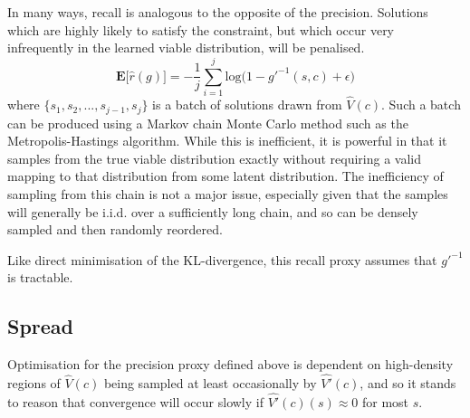\documentclass[../../main.tex]{subfiles}
\begin{document}
In many ways, recall is analogous to the opposite of the precision.
Solutions which are highly likely to satisfy the constraint, but which occur very infrequently in the learned viable distribution, will be penalised.
$$\textbf{E}\big[\hat{r}(g)\big] = -\frac{1}{j}\sum_{i=1}^{j}
\text{log} \big( 1 - g'^{-1}(s, c) + \epsilon \big)
$$
where $\{s_1, s_2, ..., s_{j-1}, s_j\}$ is a batch of solutions drawn from $\hat{V}(c)$.
Such a batch can be produced using a Markov chain Monte Carlo method such as the Metropolis-Hastings algorithm.
While this is inefficient, it is powerful in that it samples from the true viable distribution exactly without requiring a valid mapping to that distribution from some latent distribution.
The inefficiency of sampling from this chain is not a major issue, especially given that the samples will generally be i.i.d. over a sufficiently long chain, and so can be densely sampled and then randomly reordered.

Like direct minimisation of the KL-divergence, this recall proxy assumes that $g'^{-1}$ is tractable.

\subsection{Spread} \label{subsection:spread}

Optimisation for the precision proxy defined above is dependent on high-density regions of $\hat{V}(c)$ being sampled at least occasionally by $\hat{V'}(c)$, and so it stands to reason that convergence will occur slowly if $\hat{V'}(c)(s) \approx 0$ for most $s$.
\end{document}
